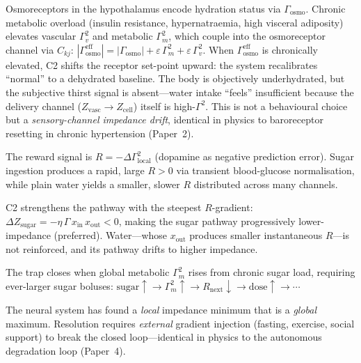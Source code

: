 \documentclass[aps,pre,twocolumn,superscriptaddress,floatfix]{revtex4-2}
\begin{document}
\begin{remark}
\label{rem:thirst-distortion}
Osmoreceptors in the hypothalamus encode hydration
status via $\Gamma_{\text{osmo}}$.
Chronic metabolic overload (insulin resistance,
hypernatraemia, high visceral adiposity) elevates
vascular $\Gamma_v^2$ and metabolic $\Gamma_m^2$,
which couple into the osmoreceptor channel via
$C_{kj}$:
$|\Gamma_{\text{osmo}}^{\text{eff}}|
= |\Gamma_{\text{osmo}}|
+ \varepsilon\,\Gamma_m^2
+ \varepsilon\,\Gamma_v^2$.
When $\Gamma_{\text{osmo}}^{\text{eff}}$ is
chronically elevated, C2 shifts the receptor
set-point upward: the system recalibrates
``normal'' to a dehydrated baseline.
The body is objectively underhydrated,
but the subjective thirst signal is absent---water
intake ``feels'' insufficient because the delivery
channel ($Z_{\text{vasc}} \to Z_{\text{cell}}$)
itself is high-$\Gamma^2$.
This is not a behavioural choice but a
\emph{sensory-channel impedance drift}, identical
in physics to baroreceptor resetting in chronic
hypertension (Paper~2).
\end{remark}

\begin{remark}
\label{rem:sugar-trap}
The reward signal is
$R = -\Delta\Gamma^2_{\text{local}}$
(dopamine as negative prediction error).
Sugar ingestion produces a rapid, large
$R > 0$ via transient blood-glucose normalisation,
while plain water yields a smaller, slower $R$
distributed across many channels.

C2 strengthens the pathway with the steepest
$R$-gradient:
$\Delta Z_{\text{sugar}} = -\eta\,\Gamma\,
x_{\text{in}}\,x_{\text{out}} < 0$,
making the sugar pathway progressively
lower-impedance (preferred).
Water---whose $x_{\text{out}}$ produces
smaller instantaneous $R$---is not reinforced,
and its pathway drifts to higher impedance.

The trap closes when global metabolic
$\Gamma^2_m$ rises from chronic sugar load,
requiring ever-larger sugar boluses:
$\text{sugar}\uparrow \to
\Gamma^2_m\!\uparrow \to
R_{\text{next}}\!\downarrow \to
\text{dose}\uparrow \to \cdots$

The neural system has found a \emph{local}
impedance minimum that is a \emph{global}
maximum.
Resolution requires \emph{external} gradient
injection (fasting, exercise, social support)
to break the closed loop---identical in physics
to the autonomous degradation loop
(Paper~4).
\end{remark}
\end{document}
